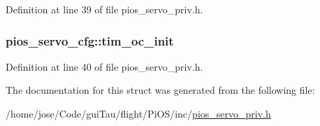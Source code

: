 Definition at line 39 of file pios\-\_\-servo\-\_\-priv.\-h.

\hypertarget{structpios__servo__cfg_ac1b8636b07f30c4a459b1c09eec6356a}{
\subsubsection[{tim\-\_\-oc\-\_\-init}]{ pios\-\_\-servo\-\_\-cfg\-::tim\-\_\-oc\-\_\-init}}\label{structpios__servo__cfg_ac1b8636b07f30c4a459b1c09eec6356a}


Definition at line 40 of file pios\-\_\-servo\-\_\-priv.\-h.



The documentation for this struct was generated from the following file\-:\begin{DoxyCompactItemize}
\item 
/home/jose/\-Code/gui\-Tau/flight/\-Pi\-O\-S/inc/\hyperlink{pios__servo__priv_8h}{pios\-\_\-servo\-\_\-priv.\-h}\end{DoxyCompactItemize}
